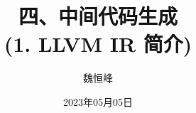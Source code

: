 \documentclass[handout]{beamer}
\title[中间代码生成]{四、中间代码生成 \\ (1. LLVM IR 简介)}
\author[魏恒峰]{\large 魏恒峰}
\institute{hfwei@nju.edu.cn}
\date{2023年05月05日}
\begin{document}
\maketitle




\thankyou{}

\end{document}

